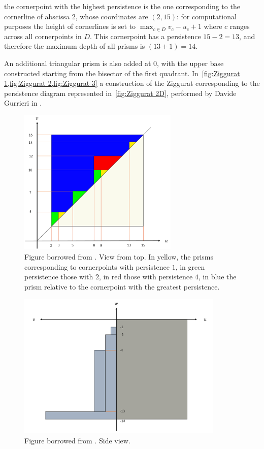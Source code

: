 \documentclass[english, LaM, oneside, noexaminfo]{sapthesis}
\begin{document}
the
cornerpoint with the highest persistence is the one corresponding to the cornerline of abscissa $2$, whose coordinates are $(2, 15)$: for computational purposes the height of cornerlines is set to $\max_{c\in D} v_c-u_c+1$ where  $c$ ranges across all cornerpoints in $D$. This cornerpoint has a persistence 
$15-2 = 13$, and therefore the maximum depth of all prisms is $(13 + 1) =  14$.


An additional triangular prism is also added at $0$, with the upper base constructed starting from the bisector of the first quadrant. In~\cref{fig:Ziggurat 1,fig:Ziggurat 2,fig:Ziggurat 3} a  construction of the Ziggurat corresponding to the persistence diagram represented in~\cref{fig:Ziggurat 2D}, performed by Davide Gurrieri in \cite{student01_my_bachel}.


\begin{figure}[tb]
\centering
\includegraphics[height=7cm]{Ziggurat 1.png}
\caption{Figure borrowed from \cite{student01_my_bachel}. View from top. In yellow, the prisms corresponding to cornerpoints with
persistence $1$, in green persistence those with $2$, in red those with persistence $4$, in blue the prism relative to the cornerpoint with the greatest persistence.
}\label{fig:Ziggurat 1}
\end{figure}

\begin{figure}[tb]
\centering
\includegraphics[height=7cm]{Ziggurat 2.png}
\caption{Figure borrowed from \cite{student01_my_bachel}. Side view.}\label{fig:Ziggurat 2}
\end{figure}
\end{document}
